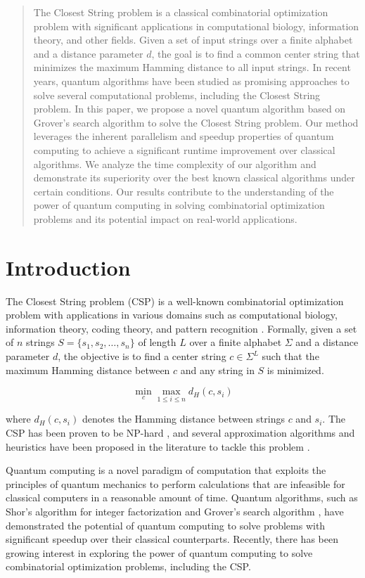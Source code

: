 \begin{abstract}
The Closest String problem is a classical combinatorial optimization problem with significant applications in computational biology, information theory, and other fields. Given a set of input strings over a finite alphabet and a distance parameter $d$, the goal is to find a common center string that minimizes the maximum Hamming distance to all input strings. In recent years, quantum algorithms have been studied as promising approaches to solve several computational problems, including the Closest String problem. In this paper, we propose a novel quantum algorithm based on Grover's search algorithm to solve the Closest String problem. Our method leverages the inherent parallelism and speedup properties of quantum computing to achieve a significant runtime improvement over classical algorithms. We analyze the time complexity of our algorithm and demonstrate its superiority over the best known classical algorithms under certain conditions. Our results contribute to the understanding of the power of quantum computing in solving combinatorial optimization problems and its potential impact on real-world applications.
\end{abstract}

\section{Introduction}

The Closest String problem (CSP) is a well-known combinatorial optimization problem with applications in various domains such as computational biology, information theory, coding theory, and pattern recognition \cite{lanctot2003closest}. Formally, given a set of $n$ strings $S = \{s_1, s_2, \dots, s_n\}$ of length $L$ over a finite alphabet $\Sigma$ and a distance parameter $d$, the objective is to find a center string $c \in \Sigma^L$ such that the maximum Hamming distance between $c$ and any string in $S$ is minimized.

\[
\min_c \max_{1 \leq i \leq n} d_H(c, s_i)
\]

where $d_H(c, s_i)$ denotes the Hamming distance between strings $c$ and $s_i$. The CSP has been proven to be NP-hard \cite{frances1999covering}, and several approximation algorithms and heuristics have been proposed in the literature to tackle this problem \cite{ma2008new,gramm2003fixed,davies2011closest}.

Quantum computing is a novel paradigm of computation that exploits the principles of quantum mechanics to perform calculations that are infeasible for classical computers in a reasonable amount of time. Quantum algorithms, such as Shor's algorithm for integer factorization \cite{shor1994algorithms} and Grover's search algorithm \cite{grover1996fast}, have demonstrated the potential of quantum computing to solve problems with significant speedup over their classical counterparts. Recently, there has been growing interest in exploring the power of quantum computing to solve combinatorial optimization problems, including the CSP.

